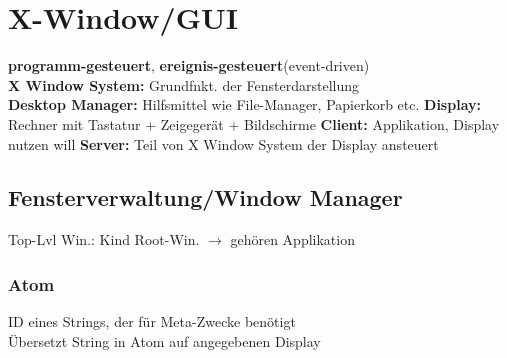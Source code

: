 \section{X-Window/GUI}
\textbf{programm-gesteuert}, \textbf{ereignis-gesteuert}(event-driven)\\
\textbf{X Window System:} Grundfnkt. der Fensterdarstellung\\
\textbf{Desktop Manager:} Hilfsmittel wie File-Manager, Papierkorb etc.
\textbf{Display:} Rechner mit Tastatur + Zeigegerät + Bildschirme
\textbf{Client:} Applikation, Display nutzen will
\textbf{Server:} Teil von X Window System der Display ansteuert



\subsection{Fensterverwaltung/Window Manager}
Top-Lvl Win.: Kind Root-Win. $\rightarrow$ gehören Applikation

\subsubsection{Atom}
ID eines Strings, der für Meta-Zwecke benötigt\\
Übersetzt String in Atom auf angegebenen Display

